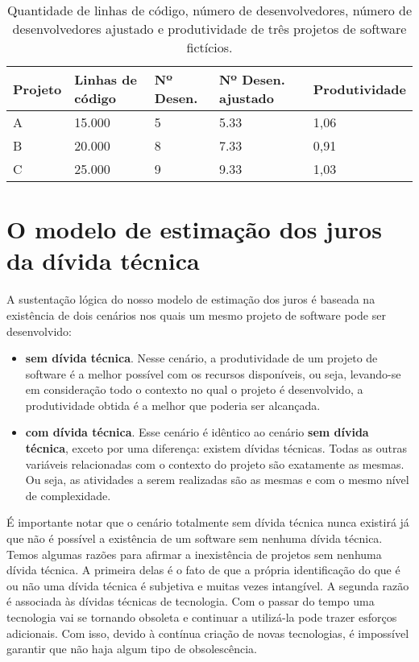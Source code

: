 \begin{table}[H]
\centering
\begin{tabular}{lllll}
\hline
\textbf{Projeto} & \textbf{Linhas de código} & \textbf{Nº Desen.} & \textbf{Nº  Desen. ajustado}  & \textbf{Produtividade}\\ \hline
A                & 15.000                     & 5       & 5.33  &        1,06          \\ \hline
B                & 20.000                     & 8       & 7.33   &       0,91         \\ \hline
C                & 25.000                     & 9        & 9.33    &      1,03         \\ \hline
\end{tabular}
\caption{Quantidade de linhas de código, número de desenvolvedores, número de desenvolvedores ajustado e produtividade de três projetos de software fictícios.}
\label{tab:examplo_aplicacao_modelo_produtividade}
\end{table}





\section{O modelo de estimação dos juros da dívida técnica}
\label{modelo_abstrato}


A sustentação lógica do nosso modelo de estimação dos juros é baseada na existência de dois cenários nos quais um mesmo projeto de software pode ser desenvolvido:

\begin{itemize} 
\item  \textbf{sem dívida técnica}. Nesse cenário, a produtividade de um projeto de software é a melhor possível com os recursos disponíveis, ou seja, levando-se em consideração todo o contexto no qual o projeto é desenvolvido, a produtividade obtida é a melhor que poderia ser alcançada. 
\item \textbf{com dívida técnica}. Esse cenário é idêntico ao cenário \textbf{sem dívida técnica}, exceto por uma diferença: existem dívidas técnicas.   Todas as outras variáveis relacionadas com o contexto do projeto são exatamente as mesmas. Ou seja, as atividades a serem realizadas são as mesmas e com o mesmo nível de complexidade.
\end{itemize}

  

É importante notar que o cenário totalmente sem dívida técnica nunca existirá já que não é possível a existência de um software sem nenhuma dívida técnica. Temos algumas razões para afirmar a inexistência de projetos sem nenhuma dívida técnica. A primeira delas é o fato de que a própria identificação do que é ou não uma dívida técnica é subjetiva e muitas vezes intangível. A segunda razão é associada às dívidas técnicas de tecnologia. Com o passar do tempo uma tecnologia vai se tornando obsoleta e continuar a utilizá-la pode trazer esforços adicionais. Com isso, devido à contínua criação de novas tecnologias, é impossível garantir que não haja algum tipo de obsolescência. 


